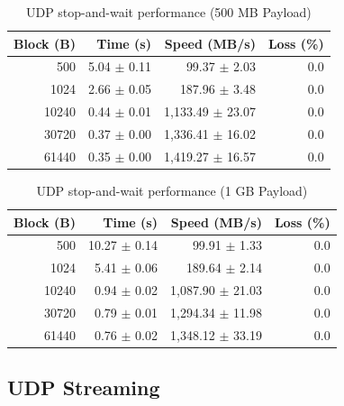 \documentclass[12pt,a4paper]{article}
\begin{document}
\begin{table}[H]
    \centering
    \begin{tabular}{rrrr}
        \toprule
        \textbf{Block (B)} & \textbf{Time (s)} & \textbf{Speed (MB/s)} & \textbf{Loss (\%)} \\
        \midrule
        500 & 5.04 $\pm$ 0.11 & 99.37 $\pm$ 2.03 & 0.0 \\
        1024 & 2.66 $\pm$ 0.05 & 187.96 $\pm$ 3.48 & 0.0 \\
        10240 & 0.44 $\pm$ 0.01 & 1,133.49 $\pm$ 23.07 & 0.0 \\
        30720 & 0.37 $\pm$ 0.00 & 1,336.41 $\pm$ 16.02 & 0.0 \\
        61440 & 0.35 $\pm$ 0.00 & 1,419.27 $\pm$ 16.57 & 0.0 \\
        \bottomrule
    \end{tabular}
    \caption{UDP stop-and-wait performance (500 MB Payload)}
    \label{tab:udp_sw_500mb}
\end{table}

\begin{table}[H]
    \centering
    \begin{tabular}{rrrr}
        \toprule
        \textbf{Block (B)} & \textbf{Time (s)} & \textbf{Speed (MB/s)} & \textbf{Loss (\%)} \\
        \midrule
        500 & 10.27 $\pm$ 0.14 & 99.91 $\pm$ 1.33 & 0.0 \\
        1024 & 5.41 $\pm$ 0.06 & 189.64 $\pm$ 2.14 & 0.0 \\
        10240 & 0.94 $\pm$ 0.02 & 1,087.90 $\pm$ 21.03 & 0.0 \\
        30720 & 0.79 $\pm$ 0.01 & 1,294.34 $\pm$ 11.98 & 0.0 \\
        61440 & 0.76 $\pm$ 0.02 & 1,348.12 $\pm$ 33.19 & 0.0 \\
        \bottomrule
    \end{tabular}
    \caption{UDP stop-and-wait performance (1 GB Payload)}
    \label{tab:udp_sw_1gb}
\end{table}

\subsection{UDP Streaming}
\end{document}

